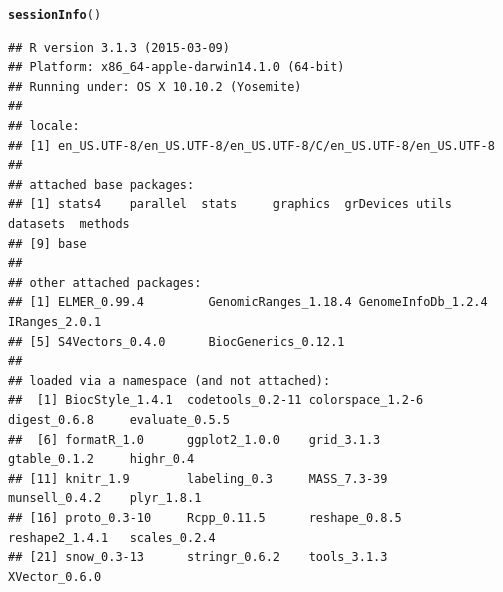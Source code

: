 \documentclass{article}\usepackage[]{graphicx}\usepackage[]{color}
\makeatletter
\newcommand{\hlstd}[1]{\textcolor[rgb]{0.345,0.345,0.345}{#1}}%
\newcommand{\hlkwd}[1]{\textcolor[rgb]{0.737,0.353,0.396}{\textbf{#1}}}%
\newenvironment{kframe}{%
 \def\at@end@of@kframe{}%
 \ifinner\ifhmode%
  \def\at@end@of@kframe{\end{minipage}}%
  \begin{minipage}{\columnwidth}%
 \fi\fi%
 \def\FrameCommand##1{\hskip\@totalleftmargin \hskip-\fboxsep
 \colorbox{shadecolor}{##1}\hskip-\fboxsep
     \hskip-\linewidth \hskip-\@totalleftmargin \hskip\columnwidth}%
 \MakeFramed {\advance\hsize-\width
   \@totalleftmargin\z@ \linewidth\hsize
   \@setminipage}}%
 {\par\unskip\endMakeFramed%
 \at@end@of@kframe}
\newenvironment{knitrout}{}{} %
\makeatother
\begin{document}
\newpage
\begin{knitrout}
\color{fgcolor}\begin{kframe}
\begin{alltt}
\hlkwd{sessionInfo}\hlstd{()}
\end{alltt}
\begin{verbatim}
## R version 3.1.3 (2015-03-09)
## Platform: x86_64-apple-darwin14.1.0 (64-bit)
## Running under: OS X 10.10.2 (Yosemite)
## 
## locale:
## [1] en_US.UTF-8/en_US.UTF-8/en_US.UTF-8/C/en_US.UTF-8/en_US.UTF-8
## 
## attached base packages:
## [1] stats4    parallel  stats     graphics  grDevices utils     datasets  methods  
## [9] base     
## 
## other attached packages:
## [1] ELMER_0.99.4         GenomicRanges_1.18.4 GenomeInfoDb_1.2.4   IRanges_2.0.1       
## [5] S4Vectors_0.4.0      BiocGenerics_0.12.1 
## 
## loaded via a namespace (and not attached):
##  [1] BiocStyle_1.4.1  codetools_0.2-11 colorspace_1.2-6 digest_0.6.8     evaluate_0.5.5  
##  [6] formatR_1.0      ggplot2_1.0.0    grid_3.1.3       gtable_0.1.2     highr_0.4       
## [11] knitr_1.9        labeling_0.3     MASS_7.3-39      munsell_0.4.2    plyr_1.8.1      
## [16] proto_0.3-10     Rcpp_0.11.5      reshape_0.8.5    reshape2_1.4.1   scales_0.2.4    
## [21] snow_0.3-13      stringr_0.6.2    tools_3.1.3      XVector_0.6.0
\end{verbatim}
\end{kframe}
\end{knitrout}
\end{document}
